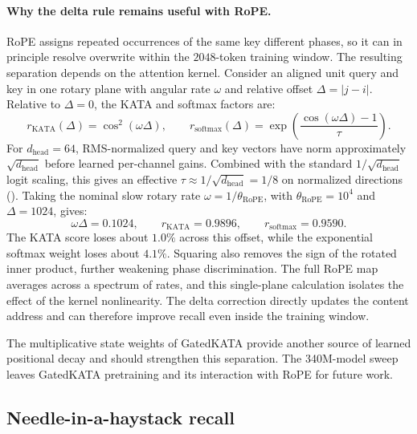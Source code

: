 \documentclass{article}
\newcommand{\1}{\bm{1}}
\theoremstyle{definition}
\begin{document}
\paragraph{Why the delta rule remains useful with RoPE.} RoPE assigns repeated occurrences of the
same key different phases, so it can in principle resolve overwrite within the $2048$-token training
window. The resulting separation depends on the attention kernel. Consider an aligned unit query
and key in one rotary plane with angular rate $\omega$ and relative offset
$\Delta=|j-i|$. Relative to $\Delta=0$, the KATA and softmax factors are:
\[
  r_{\mathrm{KATA}}(\Delta)=\cos^2(\omega\Delta),
  \qquad
  r_{\mathrm{softmax}}(\Delta)
  =\exp\!\left(\frac{\cos(\omega\Delta)-1}{\tau}\right).
\]
For $d_\text{head}=64$, RMS-normalized query and key vectors have norm approximately
$\sqrt{d_\text{head}}$ before learned per-channel gains. Combined with the standard
$1/\sqrt{d_\text{head}}$ logit scaling, this gives an effective
$\tau\approx1/\sqrt{d_\text{head}}=1/8$ on normalized directions
(). Taking the nominal slow rotary rate
$\omega=1/\theta_{\mathrm{RoPE}}$, with $\theta_{\mathrm{RoPE}}=10^4$ and
$\Delta=1024$, gives:
\[
  \omega\Delta=0.1024,
  \qquad
  r_{\mathrm{KATA}}=0.9896,
  \qquad
  r_{\mathrm{softmax}}=0.9590.
\]
The KATA score loses about $1.0\%$ across this offset, while the exponential softmax weight loses
about $4.1\%$. Squaring also removes the sign of the rotated inner product, further weakening phase
discrimination. The full RoPE map averages across a spectrum of rates, and this single-plane
calculation isolates the effect of the kernel nonlinearity. The delta correction directly updates
the content address and can therefore improve recall even inside the training window.

The multiplicative state weights of GatedKATA provide another source of learned positional decay
and should strengthen this separation. The 340M-model sweep leaves GatedKATA pretraining and its
interaction with RoPE for future work.

\subsection{Needle-in-a-haystack recall}
\label{ssec:results-niah}
\end{document}
